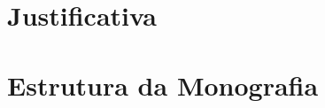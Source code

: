 \section{Justificativa}
\begin{comment}
Estamos vivendo em um mundo com muitas informações disponíveis e de fácil acesso, porém esta cada vez mais difícil filtrar e escolher as informações que vão fornecer mais insumo para o internauta.
\end{comment}


\section{Estrutura da Monografia}